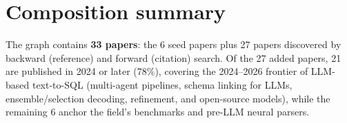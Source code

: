 \documentclass[11pt,a4paper]{article}
\begin{document}
\section{Composition summary}

The graph contains \textbf{33 papers}: the 6 seed papers plus 27 papers
discovered by backward (reference) and forward (citation) search. Of the 27
added papers, 21 are published in 2024 or later (78\%), covering the
2024--2026 frontier of LLM-based text-to-SQL (multi-agent pipelines, schema
linking for LLMs, ensemble/selection decoding, refinement, and open-source
models), while the remaining 6 anchor the field's benchmarks and pre-LLM
neural parsers.
\end{document}
